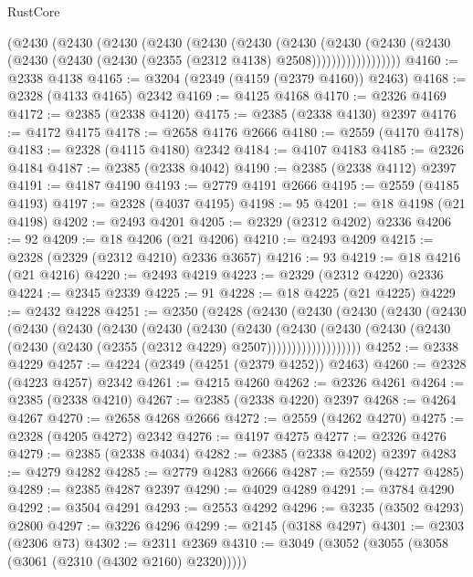 \begin{lexlean}{RustCore}
\begin{coremodule}
            (@2430
              (@2430
                (@2430
                  (@2430
                    (@2430
                      (@2430
                        (@2430
                          (@2430
                            (@2430
                              (@2430
                                (@2430 (@2430 (@2430 (@2355 (@2312 @4138) @2508))))))))))))))))))
@4160 := @2338 @4138
@4165 := @3204 (@2349 (@4159 (@2379 @4160)) @2463)
@4168 := @2328 (@4133 @4165) @2342
@4169 := @4125 @4168
@4170 := @2326 @4169
@4172 := @2385 (@2338 @4120)
@4175 := @2385 (@2338 @4130) @2397
@4176 := @4172 @4175
@4178 := @2658 @4176 @2666
@4180 := @2559 (@4170 @4178)
@4183 := @2328 (@4115 @4180) @2342
@4184 := @4107 @4183
@4185 := @2326 @4184
@4187 := @2385 (@2338 @4042)
@4190 := @2385 (@2338 @4112) @2397
@4191 := @4187 @4190
@4193 := @2779 @4191 @2666
@4195 := @2559 (@4185 @4193)
@4197 := @2328 (@4037 @4195)
@4198 := 95
@4201 := @18 @4198 (@21 @4198)
@4202 := @2493 @4201
@4205 := @2329 (@2312 @4202) @2336
@4206 := 92
@4209 := @18 @4206 (@21 @4206)
@4210 := @2493 @4209
@4215 := @2328 (@2329 (@2312 @4210) @2336 @3657)
@4216 := 93
@4219 := @18 @4216 (@21 @4216)
@4220 := @2493 @4219
@4223 := @2329 (@2312 @4220) @2336
@4224 := @2345 @2339
@4225 := 91
@4228 := @18 @4225 (@21 @4225)
@4229 := @2432 @4228
@4251 := @2350
    (@2428
      (@2430
        (@2430
          (@2430
            (@2430
              (@2430
                (@2430
                  (@2430
                    (@2430
                      (@2430
                        (@2430
                          (@2430
                            (@2430
                              (@2430
                                (@2430
                                  (@2430 (@2430 (@2430 (@2355 (@2312 @4229) @2507)))))))))))))))))))
@4252 := @2338 @4229
@4257 := @4224 (@2349 (@4251 (@2379 @4252)) @2463)
@4260 := @2328 (@4223 @4257) @2342
@4261 := @4215 @4260
@4262 := @2326 @4261
@4264 := @2385 (@2338 @4210)
@4267 := @2385 (@2338 @4220) @2397
@4268 := @4264 @4267
@4270 := @2658 @4268 @2666
@4272 := @2559 (@4262 @4270)
@4275 := @2328 (@4205 @4272) @2342
@4276 := @4197 @4275
@4277 := @2326 @4276
@4279 := @2385 (@2338 @4034)
@4282 := @2385 (@2338 @4202) @2397
@4283 := @4279 @4282
@4285 := @2779 @4283 @2666
@4287 := @2559 (@4277 @4285)
@4289 := @2385 @4287 @2397
@4290 := @4029 @4289
@4291 := @3784 @4290
@4292 := @3504 @4291
@4293 := @2553 @4292
@4296 := @3235 (@3502 @4293) @2800
@4297 := @3226 @4296
@4299 := @2145 (@3188 @4297)
@4301 := @2303 (@2306 @73)
@4302 := @2311 @2369
@4310 := @3049 (@3052 (@3055 (@3058 (@3061 (@2310 (@4302 @2160) @2320)))))

\end{coremodule}
\end{lexlean}
